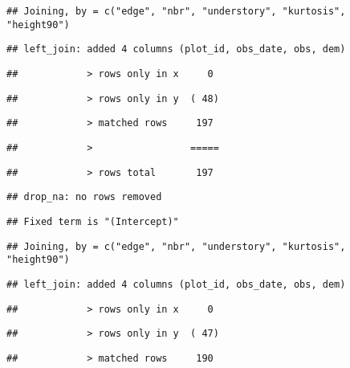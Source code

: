 \documentclass[
]{article}
\begin{document}
\begin{verbatim}
## Joining, by = c("edge", "nbr", "understory", "kurtosis", "height90")
\end{verbatim}

\begin{verbatim}
## left_join: added 4 columns (plot_id, obs_date, obs, dem)
\end{verbatim}

\begin{verbatim}
##            > rows only in x     0
\end{verbatim}

\begin{verbatim}
##            > rows only in y  ( 48)
\end{verbatim}

\begin{verbatim}
##            > matched rows     197
\end{verbatim}

\begin{verbatim}
##            >                 =====
\end{verbatim}

\begin{verbatim}
##            > rows total       197
\end{verbatim}

\begin{verbatim}
## drop_na: no rows removed
\end{verbatim}

\begin{verbatim}
## Fixed term is "(Intercept)"
\end{verbatim}

\begin{verbatim}
## Joining, by = c("edge", "nbr", "understory", "kurtosis", "height90")
\end{verbatim}

\begin{verbatim}
## left_join: added 4 columns (plot_id, obs_date, obs, dem)
\end{verbatim}

\begin{verbatim}
##            > rows only in x     0
\end{verbatim}

\begin{verbatim}
##            > rows only in y  ( 47)
\end{verbatim}

\begin{verbatim}
##            > matched rows     190
\end{verbatim}
\end{document}
